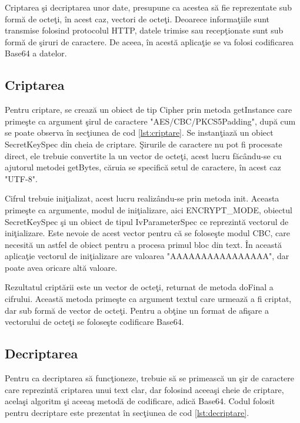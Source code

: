 Criptarea \c{s}i decriptarea unor date, presupune ca acestea s\u{a} fie reprezentate sub form\u{a} de octe\c{t}i, \^{i}n acest caz, vectori de octe\c{t}i. Deoarece informa\c{t}iile sunt transmise folosind protocolul HTTP, datele trimise sau recep\c{t}ionate sunt sub form\u{a} de \c{s}iruri de caractere. De aceea, \^{i}n acest\u{a} aplica\c{t}ie se va folosi codificarea Base64 a datelor\cite{base64}.
\subsection{Criptarea}

Pentru criptare, se creaz\u{a} un obiect de tip Cipher prin metoda getInstance care prime\c{s}te ca argument \c{s}irul de caractere "AES/CBC/PKCS5Padding", dup\u{a} cum se poate observa \^{i}n sec\c{t}iunea de cod \ref{lst:criptare}. Se instan\c{t}iaz\u{a} un obiect SecretKeySpec din cheia de criptare. \c{S}irurile de caractere nu pot fi procesate direct, ele trebuie convertite la un vector de octe\c{t}i, acest lucru f\u{a}c\^{a}ndu-se cu ajutorul metodei getBytes, c\u{a}ruia se specific\u{a} setul de caractere, \^{i}n acest caz "UTF-8".

\lstset{caption=Cod folosit pentru criptare,label=lst:criptare}


Cifrul trebuie ini\c{t}ializat, acest lucru realiz\^{a}ndu-se prin metoda init. Aceasta prime\c{s}te ca argumente, modul de ini\c{t}ializare, aici ENCRYPT_MODE, obiectul SecretKeySpec \c{s}i un obiect de tipul IvParameterSpec ce reprezint\u{a} vectorul de ini\c{t}ializare. Este nevoie de acest vector pentru c\u{a} se folose\c{s}te modul CBC, care necesit\u{a} un astfel de obiect pentru a procesa primul bloc din text. \^{I}n aceast\u{a} aplica\c{t}ie vectorul de ini\c{t}ializare are valoarea "AAAAAAAAAAAAAAAA", dar poate avea oricare alt\u{a} valoare.

Rezultatul cript\u{a}rii este un vector de octe\c{t}i, returnat de metoda doFinal a cifrului. Aceast\u{a} metoda prime\c{s}te ca argument textul care urmeaz\u{a} a fi criptat, dar sub form\u{a} de vector de octe\c{t}i. Pentru a ob\c{t}ine un format de afi\c{s}are a vectorului de octe\c{t}i se folose\c{s}te codificare Base64.

\subsection{Decriptarea}

Pentru ca decriptarea s\u{a} func\c{t}ioneze, trebuie s\u{a} se primeasc\u{a} un \c{s}ir de caractere care reprezint\u{a} criptarea unui text clar, dar folosind aceea\c{s}i cheie de criptare, acela\c{s}i algoritm \c{s}i aceea\c{s} metod\u{a} de codificare, adic\u{a} Base64. Codul folosit pentru decriptare este prezentat \^{i}n sec\c{t}iunea de cod \ref{lst:decriptare}.


